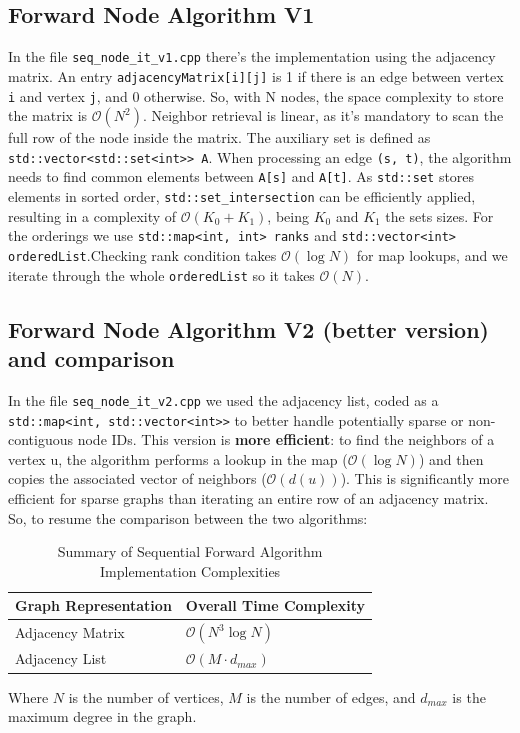 \documentclass{aes2e}
\begin{document}
\subsection{Forward Node Algorithm V1}
In the file \texttt{seq\_node\_it\_v1.cpp} there's the implementation using the adjacency matrix. An entry \texttt{adjacencyMatrix[i][j]} is 1 if there is an edge between vertex \texttt{i} and vertex \texttt{j}, and 0 otherwise. So, with N nodes, the space complexity to store the matrix is $\mathcal{O}\left(N^2\right)$. Neighbor retrieval is linear, as it's mandatory to scan the full row of the node inside the matrix. The auxiliary set is defined as \texttt{std::vector<std::set<int>> A}. When processing an edge \texttt{(s, t)}, the algorithm needs to find common elements between \texttt{A[s]} and \texttt{A[t]}. As \texttt{std::set} stores elements in sorted order, \texttt{std::set\_intersection} can be efficiently applied, resulting in a complexity of $\mathcal{O}\left(K_0 + K_1\right)$, being $K_0$ and $K_1$ the sets sizes. For the orderings we use \texttt{std::map<int, int> ranks} and \texttt{std::vector<int> orderedList}.Checking rank condition takes $\mathcal{O}\left(\log N\right)$ for map lookups, and we iterate through the whole \texttt{orderedList} so it takes $\mathcal{O}\left( N\right)$. \\
\subsection{Forward Node Algorithm V2 (better version) and comparison}
In the file \texttt{seq\_node\_it\_v2.cpp} we used the adjacency list, coded as a \texttt{std::map<int, std::vector<int>>} to better handle potentially sparse or non-contiguous node IDs. This version is \textbf{more efficient}: to find the neighbors of a vertex u, the algorithm performs a lookup in the map ($\mathcal{O}\left(\log N\right)$) and then copies the associated vector of neighbors ($\mathcal{O}\left( d(u)\right)$). This is significantly more efficient for sparse graphs than iterating an entire row of an adjacency matrix. \\
So, to resume the comparison between the two algorithms:
\begin{table}[htbp]
    \centering
    \caption{Summary of Sequential Forward Algorithm Implementation Complexities}
    \label{tab:forward_complexity_summary}
    \begin{tabular}{|l|l|}
        \hline
        \textbf{Graph Representation} & \textbf{Overall Time Complexity} \\
        \hline
        Adjacency Matrix & $\mathcal{O}(N^3 \log N)$ \\
        Adjacency List & $\mathcal{O}(M \cdot d_{max})$ \\
        \hline
    \end{tabular}
    \vspace{0.5em} %
    \small
    Where $N$ is the number of vertices, $M$ is the number of edges, and $d_{max}$ is the maximum degree in the graph.
\end{table}
\end{document}
